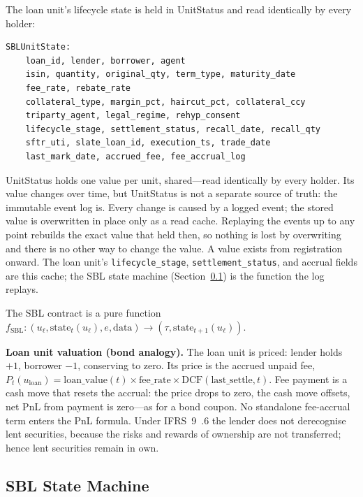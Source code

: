 The loan unit's lifecycle state is held in UnitStatus and read identically by every holder:

\begin{lstlisting}
SBLUnitState:
    loan_id, lender, borrower, agent
    isin, quantity, original_qty, term_type, maturity_date
    fee_rate, rebate_rate
    collateral_type, margin_pct, haircut_pct, collateral_ccy
    triparty_agent, legal_regime, rehyp_consent
    lifecycle_stage, settlement_status, recall_date, recall_qty
    sftr_uti, slate_loan_id, execution_ts, trade_date
    last_mark_date, accrued_fee, fee_accrual_log
\end{lstlisting}

\begin{remark}
UnitStatus holds one value per unit, shared---read identically by every holder. Its value changes over time, but UnitStatus is not a separate source of truth: the immutable event log is. Every change is caused by a logged event; the stored value is overwritten in place only as a read cache. Replaying the events up to any point rebuilds the exact value that held then, so nothing is lost by overwriting and there is no other way to change the value. A value exists from registration onward. The loan unit's \texttt{lifecycle\_stage}, \texttt{settlement\_status}, and accrual fields are this cache; the SBL state machine (Section~\ref{sec:sbl-state-machine}) is the function the log replays.
\end{remark}

\noindent The SBL contract is a pure function $f_{\mathrm{SBL}}:(u_\ell,\mathrm{state}_t(u_\ell),e,\mathrm{data}) \to (\tau,\mathrm{state}_{t+1}(u_\ell))$.

\noindent\textbf{Loan unit valuation (bond analogy).} The loan unit is priced: lender holds $+1$, borrower $-1$, conserving to zero. Its price is the accrued unpaid fee, $P_t(u_{\mathrm{loan}}) = \mathrm{loan\_value}(t)\times\mathrm{fee\_rate}\times\mathrm{DCF}(\mathrm{last\_settle},t)$. Fee payment is a cash move that resets the accrual: the price drops to zero, the cash move offsets, net PnL from payment is zero---as for a bond coupon. No standalone fee-accrual term enters the PnL formula. Under IFRS~9~.6 the lender does not derecognise lent securities, because the risks and rewards of ownership are not transferred; hence lent securities remain in $\mathrm{own}$.

\subsection{SBL State Machine}
\label{sec:sbl-state-machine}

